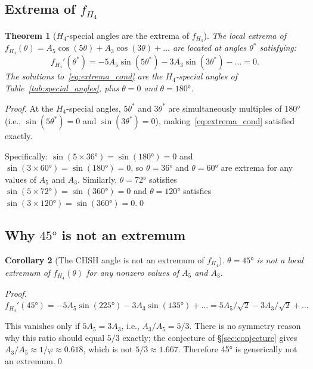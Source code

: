 \documentclass[11pt,a4paper]{article}
\newtheorem{theorem}{Theorem}[section]
\newtheorem{corollary}[theorem]{Corollary}
\newcommand{\phig}{\varphi}
\begin{document}
\subsection{Extrema of $f_{H_4}$}

\begin{theorem}[$H_4$-special angles are the extrema of $f_{H_4}$]
\label{thm:extrema}
The local extrema of $f_{H_4}(\theta) = A_5\cos(5\theta) +
A_3\cos(3\theta) + \ldots$ are located at angles
$\theta^*$ satisfying:
\begin{equation}
f_{H_4}'(\theta^*)
= -5A_5\sin(5\theta^*) - 3A_3\sin(3\theta^*) - \ldots = 0.
\label{eq:extrema_cond}
\end{equation}
The solutions to~\eqref{eq:extrema_cond} are the $H_4$-special
angles of Table~\ref{tab:special_angles}, plus $\theta = 0$ and
$\theta = 180°$.
\end{theorem}

\begin{proof}
At the $H_4$-special angles, $5\theta^*$ and $3\theta^*$ are
simultaneously multiples of $180°$ (i.e., $\sin(5\theta^*)=0$ and
$\sin(3\theta^*)=0$), making~\eqref{eq:extrema_cond} satisfied
exactly.

Specifically: $\sin(5\times36°) = \sin(180°) = 0$ and
$\sin(3\times60°) = \sin(180°) = 0$, so $\theta = 36°$ and
$\theta = 60°$ are extrema for any values of $A_5$ and $A_3$.
Similarly, $\theta = 72°$ satisfies $\sin(5\times72°) =
\sin(360°) = 0$ and $\theta = 120°$ satisfies $\sin(3\times120°) =
\sin(360°) = 0$.\qed
\end{proof}

\subsection{Why $45°$ is not an extremum}

\begin{corollary}[The CHSH angle is not an extremum of $f_{H_4}$]
\label{cor:45}
$\theta = 45°$ is not a local extremum of $f_{H_4}(\theta)$ for
any nonzero values of $A_5$ and $A_3$.
\end{corollary}

\begin{proof}
$f_{H_4}'(45°) = -5A_5\sin(225°) - 3A_3\sin(135°) + \ldots
= 5A_5/\sqrt{2} - 3A_3/\sqrt{2} + \ldots$

This vanishes only if $5A_5 = 3A_3$, i.e., $A_3/A_5 = 5/3$.  There
is no symmetry reason why this ratio should equal $5/3$ exactly; the
conjecture of \S\ref{sec:conjecture} gives $A_3/A_5 \approx 1/\phig
\approx 0.618$, which is not $5/3 \approx 1.667$.  Therefore 45° is
generically not an extremum.\qed
\end{proof}
\end{document}
